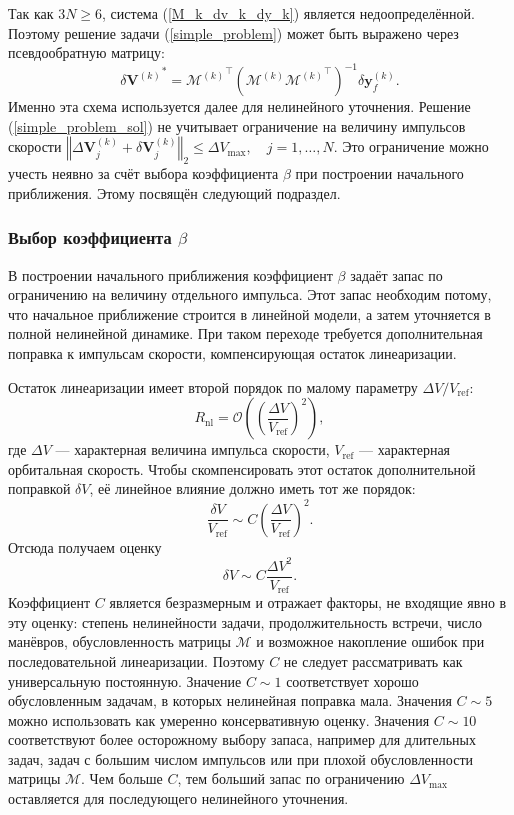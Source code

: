 Так как $3N \geq 6$, система (\ref{M_k_dv_k_dy_k}) является недоопределённой. Поэтому решение задачи (\ref{simple_problem}) может быть выражено через псевдообратную матрицу:
\begin{equation}
    \delta {\mathbf{V}^{(k)}}^* = {\mathcal{M}^{(k)}}^\top \left( \mathcal{M}^{(k)} {\mathcal{M}^{(k)}}^\top \right)^{-1} \delta \mathbf{y}_f^{(k)}.
\label{simple_problem_sol}
\end{equation}
Именно эта схема используется далее для нелинейного уточнения. Решение (\ref{simple_problem_sol}) не учитывает ограничение на величину импульсов скорости $\left\Vert \Delta \mathbf{V}_j^{(k)} + \delta \mathbf{V}_j^{(k)} \right\Vert_2 \leq \Delta V_{\text{max}}, \quad j = 1, \dots, N$. Это ограничение можно учесть неявно за счёт выбора коэффициента $\beta$ при построении начального приближения. Этому посвящён следующий подраздел.

\subsubsection{Выбор коэффициента $\beta$}

В построении начального приближения коэффициент $\beta$ задаёт запас по ограничению на величину отдельного импульса. Этот запас необходим потому, что начальное приближение строится в линейной модели, а затем уточняется в полной нелинейной динамике. При таком переходе требуется дополнительная поправка к импульсам скорости, компенсирующая остаток линеаризации.

Остаток линеаризации имеет второй порядок по малому параметру $\Delta V / V_{\text{ref}}$:
\begin{equation}
    R_{\text{nl}} = \mathcal{O} \left( \left( \frac{\Delta V}{V_{\text{ref}}} \right)^2 \right),
\label{R_nl}
\end{equation}
где $\Delta V$ --- характерная величина импульса скорости, $V_{\text{ref}}$ --- характерная орбитальная скорость. Чтобы скомпенсировать этот остаток дополнительной поправкой $\delta V$, её линейное влияние должно иметь тот же порядок:
\begin{equation}
    \frac{\delta V}{V_{\text{ref}}} \sim C \left( \frac{\Delta V}{V_{\text{ref}}} \right)^2.
\end{equation}
Отсюда получаем оценку
\begin{equation}
    \delta V \sim C \frac{\Delta V^2}{V_{\text{ref}}}.
\label{dv_estimation}
\end{equation}
Коэффициент $C$ является безразмерным и отражает факторы, не входящие явно в эту оценку: степень нелинейности задачи, продолжительность встречи, число манёвров, обусловленность матрицы $\mathcal{M}$ и возможное накопление ошибок при последовательной линеаризации. Поэтому $C$ не следует рассматривать как универсальную постоянную. Значение $C \sim 1$ соответствует хорошо обусловленным задачам, в которых нелинейная поправка мала. Значения $C \sim 5$ можно использовать как умеренно консервативную оценку. Значения $C \sim 10$ соответствуют более осторожному выбору запаса, например для длительных задач, задач с большим числом импульсов или при плохой обусловленности матрицы $\mathcal{M}$. Чем больше $C$, тем больший запас по ограничению $\Delta V_{\max}$ оставляется для последующего нелинейного уточнения.

